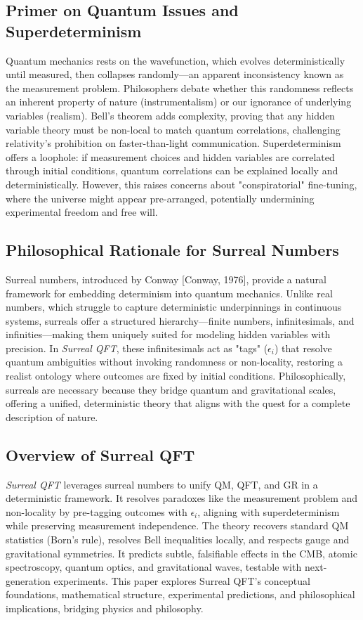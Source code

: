 \documentclass{article}
\begin{document}
\subsection{Primer on Quantum Issues and Superdeterminism}
Quantum mechanics rests on the wavefunction, which evolves deterministically until measured, then collapses randomly—an apparent inconsistency known as the measurement problem. Philosophers debate whether this randomness reflects an inherent property of nature (instrumentalism) or our ignorance of underlying variables (realism). Bell's theorem adds complexity, proving that any hidden variable theory must be non-local to match quantum correlations, challenging relativity's prohibition on faster-than-light communication. Superdeterminism offers a loophole: if measurement choices and hidden variables are correlated through initial conditions, quantum correlations can be explained locally and deterministically. However, this raises concerns about "conspiratorial" fine-tuning, where the universe might appear pre-arranged, potentially undermining experimental freedom and free will.

\subsection{Philosophical Rationale for Surreal Numbers}
Surreal numbers, introduced by Conway [Conway, 1976], provide a natural framework for embedding determinism into quantum mechanics. Unlike real numbers, which struggle to capture deterministic underpinnings in continuous systems, surreals offer a structured hierarchy—finite numbers, infinitesimals, and infinities—making them uniquely suited for modeling hidden variables with precision. In \textit{Surreal QFT}, these infinitesimals act as "tags" (\(\epsilon_i\)) that resolve quantum ambiguities without invoking randomness or non-locality, restoring a realist ontology where outcomes are fixed by initial conditions. Philosophically, surreals are necessary because they bridge quantum and gravitational scales, offering a unified, deterministic theory that aligns with the quest for a complete description of nature.

\subsection{Overview of Surreal QFT}
\textit{Surreal QFT} leverages surreal numbers to unify QM, QFT, and GR in a deterministic framework. It resolves paradoxes like the measurement problem and non-locality by pre-tagging outcomes with \(\epsilon_i\), aligning with superdeterminism while preserving measurement independence. The theory recovers standard QM statistics (Born's rule), resolves Bell inequalities locally, and respects gauge and gravitational symmetries. It predicts subtle, falsifiable effects in the CMB, atomic spectroscopy, quantum optics, and gravitational waves, testable with next-generation experiments. This paper explores Surreal QFT's conceptual foundations, mathematical structure, experimental predictions, and philosophical implications, bridging physics and philosophy.
\end{document}
